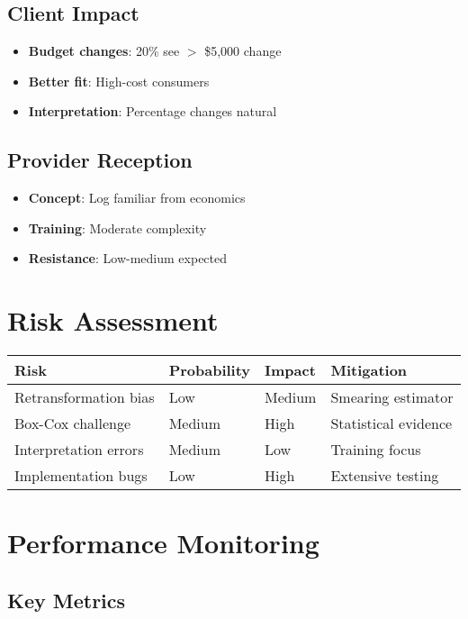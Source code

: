 \subsection{Client Impact}

\begin{itemize}
    \item \textbf{Budget changes}: 20\% see $>$ \$5,000 change
    \item \textbf{Better fit}: High-cost consumers
    \item \textbf{Interpretation}: Percentage changes natural
\end{itemize}

\subsection{Provider Reception}

\begin{itemize}
    \item \textbf{Concept}: Log familiar from economics
    \item \textbf{Training}: Moderate complexity
    \item \textbf{Resistance}: Low-medium expected
\end{itemize}

\section{Risk Assessment}

\begin{center}
\begin{tabular}{llll}
\toprule
Risk & Probability & Impact & Mitigation \\
\midrule
Retransformation bias & Low & Medium & Smearing estimator \\
Box-Cox challenge & Medium & High & Statistical evidence \\
Interpretation errors & Medium & Low & Training focus \\
Implementation bugs & Low & High & Extensive testing \\
\bottomrule
\end{tabular}
\end{center}

\section{Performance Monitoring}

\subsection{Key Metrics}

